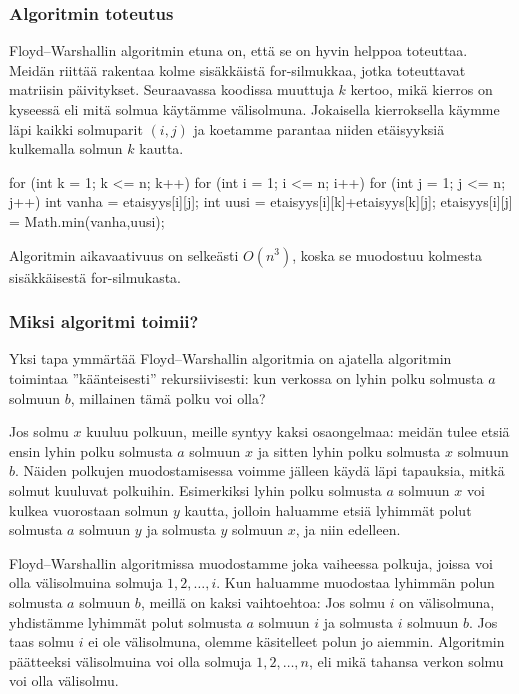 \subsubsection{Algoritmin toteutus}

Floyd–Warshallin algoritmin etuna on, että se on hyvin helppoa toteuttaa.
Meidän riittää rakentaa kolme sisäkkäistä for-silmukkaa,
jotka toteuttavat matriisin päivitykset.
Seuraavassa koodissa muuttuja $k$ kertoo,
mikä kierros on kyseessä eli mitä solmua käytämme välisolmuna.
Jokaisella kierroksella käymme läpi kaikki solmuparit $(i,j)$
ja koetamme parantaa niiden etäisyyksiä kulkemalla solmun $k$ kautta.

\begin{code}
for (int k = 1; k <= n; k++) {
    for (int i = 1; i <= n; i++) {
        for (int j = 1; j <= n; j++) {
            int vanha = etaisyys[i][j];
            int uusi = etaisyys[i][k]+etaisyys[k][j];
            etaisyys[i][j] = Math.min(vanha,uusi);
        }
    }
}
\end{code}

Algoritmin aikavaativuus on selkeästi $O(n^3)$,
koska se muodostuu kolmesta sisäkkäisestä for-silmukasta.

\subsubsection{Miksi algoritmi toimii?}

Yksi tapa ymmärtää Floyd–Warshallin algoritmia on
ajatella algoritmin toimintaa ''käänteisesti'' rekursiivisesti:
kun verkossa on lyhin polku solmusta $a$ solmuun $b$,
millainen tämä polku voi olla?

Jos solmu $x$ kuuluu polkuun, meille syntyy kaksi osaongelmaa:
meidän tulee etsiä ensin lyhin polku solmusta $a$ solmuun $x$
ja sitten lyhin polku solmusta $x$ solmuun $b$.
Näiden polkujen muodostamisessa voimme jälleen käydä läpi tapauksia,
mitkä solmut kuuluvat polkuihin.
Esimerkiksi lyhin polku solmusta $a$ solmuun $x$
voi kulkea vuorostaan solmun $y$ kautta,
jolloin haluamme etsiä lyhimmät polut solmusta $a$ solmuun $y$
ja solmusta $y$ solmuun $x$, ja niin edelleen.

Floyd–Warshallin algoritmissa muodostamme joka vaiheessa
polkuja, joissa voi olla välisolmuina solmuja $1,2,\dots,i$.
Kun haluamme muodostaa lyhimmän polun solmusta $a$ solmuun $b$,
meillä on kaksi vaihtoehtoa:
Jos solmu $i$ on välisolmuna, yhdistämme lyhimmät polut
solmusta $a$ solmuun $i$ ja solmusta $i$ solmuun $b$.
Jos taas solmu $i$ ei ole välisolmuna, olemme käsitelleet
polun jo aiemmin.
Algoritmin päätteeksi välisolmuina voi olla solmuja $1,2,\dots,n$,
eli mikä tahansa verkon solmu voi olla välisolmu.
